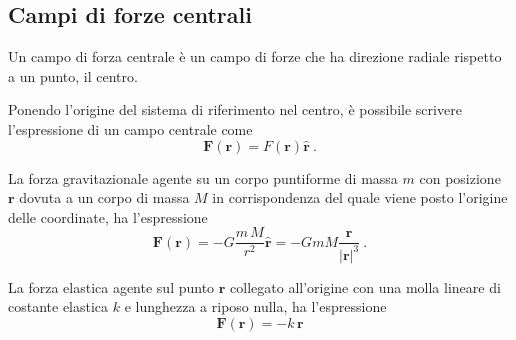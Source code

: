 \subsection{Campi di forze centrali}
\begin{definition} Un campo di forza centrale è un campo di forze che ha direzione radiale rispetto a un punto, il centro.

\noindent
Ponendo l'origine del sistema di riferimento nel centro, è possibile scrivere l'espressione di un campo centrale come
    \begin{equation}
        \mathbf{F}(\mathbf{r}) = F(\mathbf{r}) \mathbf{\hat{r}} \ .
    \end{equation}
\end{definition}

\begin{example} La forza gravitazionale agente su un corpo puntiforme di massa $m$ con posizione $\mathbf{r}$ dovuta a un corpo di massa $M$ in corrispondenza del quale viene posto l'origine delle coordinate, ha l'espressione
    \begin{equation}
        \mathbf{F}(\mathbf{r}) = - G \dfrac{m \, M}{r^2} \mathbf{\hat{r}} = - G m M \dfrac{\mathbf{r}}{|\mathbf{r}|^3} \ .
    \end{equation}
\end{example}

\begin{example} La forza elastica agente sul punto $\mathbf{r}$ collegato all'origine con una molla lineare di costante elastica $k$ e lunghezza a riposo nulla, ha l'espressione
    \begin{equation}
        \mathbf{F}(\mathbf{r}) = - k \, \mathbf{r}
    \end{equation}
\end{example}



